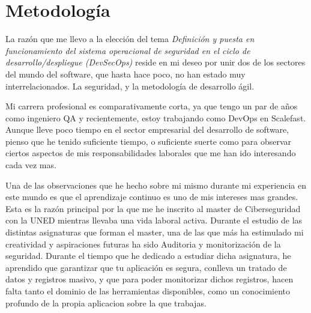 \documentclass[12pt]{report} %
\begin{document}
	














\clearpage
{} %


\chapter{Metodología}


La razón que me llevo a la elección del tema \textit{Definición y puesta en 
funcionamiento del sistema operacional de seguridad en el ciclo de 
desarrollo/despliegue (DevSecOps)} reside en mi deseo por unir dos de los
sectores del mundo del software, que hasta hace poco, no han estado muy 
interrelacionados.
La seguridad, y la metodología de desarrollo ágil.

Mi carrera profesional es comparativamente corta, ya que tengo un par de años
como ingeniero QA y recientemente, estoy trabajando como DevOps en Scalefast. 
Aunque lleve poco tiempo en el sector empresarial del desarrollo de software,
pienso que he tenido suficiente tiempo, o suficiente suerte como para observar
ciertos aspectos de mis responsabilidades laborales que me han ido interesando
cada vez mas.

Una de las observaciones que he hecho sobre mi mismo durante mi experiencia en
este mundo es que el aprendizaje continuo es uno de mis intereses mas grandes.
Esta es la razón principal por la que me he inscrito al master de 
Ciberseguridad con la UNED mientras llevaba una vida laboral activa.  
Durante el estudio de las distintas asignaturas que forman el master, una de 
las que más ha estimulado mi creatividad y aspiraciones futuras ha sido
Auditoria y monitorización de la seguridad. 
Durante el tiempo que he dedicado a estudiar dicha asignatura, he aprendido que
garantizar que tu aplicación es segura, conlleva un tratado de
datos y registros masivo, y que para poder monitorizar dichos registros, hacen
falta tanto el dominio de las herramientas disponibles, como un conocimiento
profundo de la propia aplicacion sobre la que trabajas.
\end{document}
